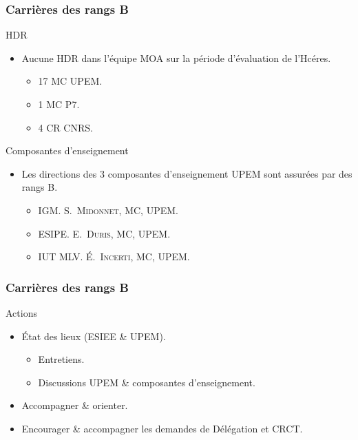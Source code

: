 \documentclass[]{beamer}
\begin{document}

\begin{frame}
  \frametitle{Carrières des rangs B}

  \begin{block}{HDR}
    \begin{itemize}
      \item Aucune HDR dans l'équipe MOA sur la période d'évaluation de l'Hcéres.
      \begin{itemize}
        \item 17 MC UPEM.
        \item 1 MC P7.
        \item 4 CR CNRS.
      \end{itemize}
    \end{itemize}
  \end{block}

  \begin{block}{Composantes d'enseignement}
    \begin{itemize}
      \item Les directions des 3 composantes d'enseignement UPEM
      sont assurées par des rangs B.
      \begin{itemize}
        \item IGM. \textsc{S.~Midonnet}, MC, UPEM.
        \item ESIPE. \textsc{E.~Duris}, MC, UPEM.
        \item IUT MLV. \textsc{\'E.~Incerti}, MC, UPEM.
      \end{itemize}
    \end{itemize}
  \end{block}

\end{frame}


\begin{frame}
  \frametitle{Carrières des rangs B}

  \begin{block}{Actions}
    \begin{itemize}
      \item \'Etat des lieux (ESIEE \& UPEM).
      \begin{itemize}
        \item Entretiens.
        \item Discussions UPEM \& composantes d'enseignement.
      \end{itemize}
      \item Accompagner \& orienter.
      \item Encourager \& accompagner les demandes de Délégation et CRCT.
    \end{itemize}
  \end{block}
\end{frame}
\end{document}
